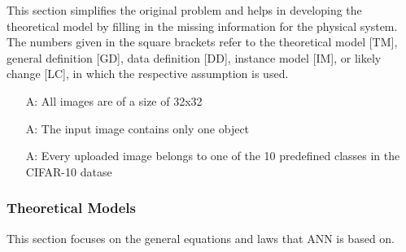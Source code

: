 \documentclass[12pt]{article}
\newcounter{assumpnum} %
\begin{document}
This section simplifies the original problem and helps in developing the
theoretical model by filling in the missing information for the physical system.
The numbers given in the square brackets refer to the theoretical model [TM],
general definition [GD], data definition [DD], instance model [IM], or likely
change [LC], in which the respective assumption is used.

\begin{itemize}

\item[A\refstepcounter{assumpnum}\theassumpnum \label{A_meaningfulLabel}:]
All images are of a size of 32x32
\item[A\refstepcounter{assumpnum}\theassumpnum \label{A_meaningfulLabel}:]
 The input image contains only one object
 \item[A\refstepcounter{assumpnum}\theassumpnum \label{A_meaningfulLabel}:]
 Every uploaded image belongs to one of the 10 predefined classes in the CIFAR-10 datase

\end{itemize}

\subsubsection{Theoretical Models}\label{sec_theoretical}



This section focuses on the general equations and laws that ANN is based
on.  
\end{document}
